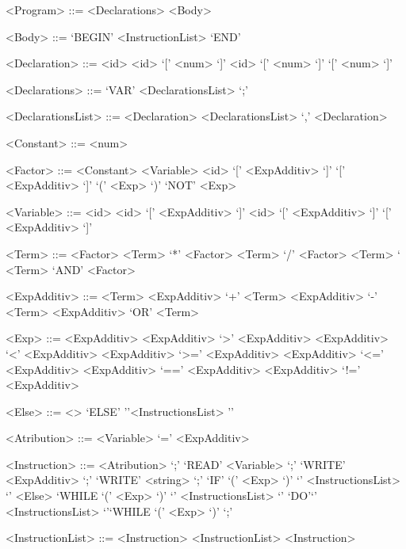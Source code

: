 \begin{grammar}

<Program> ::= <Declarations> <Body> 

<Body> ::= `BEGIN' <InstructionList> `END'

<Declaration> ::= <id>
\alt <id> `[' <num> `]'
\alt <id> `[' <num> `]' `[' <num> `]' 

<Declarations> ::= `VAR' <DeclarationsList> `;' 

<DeclarationsList> ::= <Declaration> 
\alt <DeclarationsList> `,' <Declaration> 

<Constant> ::= <num>


<Factor> ::= <Constant>
\alt <Variable>
\alt <id> `[' <ExpAdditiv> `]' `[' <ExpAdditiv> `]'
\alt `(' <Exp> `)'
\alt `NOT' <Exp>

<Variable> ::= <id>
\alt <id> `[' <ExpAdditiv> `]'
\alt <id> `[' <ExpAdditiv> `]' `[' <ExpAdditiv> `]' 
 
<Term> ::= <Factor>
\alt <Term> `*'  <Factor>
\alt <Term> `/' <Factor>
\alt <Term> `%
\alt <Term> `AND' <Factor>

<ExpAdditiv> ::= <Term> 
\alt <ExpAdditiv> `+' <Term>
\alt <ExpAdditiv> `-' <Term> 
\alt <ExpAdditiv> `OR' <Term> 


<Exp> ::= <ExpAdditiv>             
\alt  <ExpAdditiv> `>'  <ExpAdditiv> 
\alt  <ExpAdditiv> `<'  <ExpAdditiv> 
\alt  <ExpAdditiv> `>=' <ExpAdditiv> 
\alt  <ExpAdditiv> `<=' <ExpAdditiv> 
\alt  <ExpAdditiv> `==' <ExpAdditiv> 
\alt  <ExpAdditiv> `!=' <ExpAdditiv> 

<Else> ::= <>
\alt `ELSE' '{'<InstructionsList> '}'

<Atribution> ::=  <Variable> `=' <ExpAdditiv> 

<Instruction> ::= <Atribution> `;' 
\alt `READ'  <Variable> `;'
\alt `WRITE' <ExpAdditiv> `;'                      
\alt `WRITE' <string> `;'
\alt `IF' `(' <Exp> `)' `{' <InstructionsList> `}' <Else>
\alt `WHILE `(' <Exp> `)' `{' <InstructionsList> `}' 
\alt `DO'`{' <InstructionsList> `}'`WHILE `(' <Exp> `)' `;' 

<InstructionList> ::= <Instruction>
\alt <InstructionList> <Instruction>  

\end{grammar}

